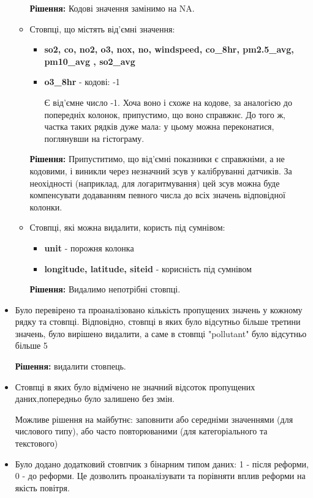 \documentclass[./report.tex]{subfiles}
\begin{document}
\begin{itemize}
\begin{itemize}
            \textbf{ Рішення:} Кодові значення замінимо на NA.

             \item Стовпці, що містять від'ємні значення:
             \begin{itemize}
                \item \textbf{so2, co, no2,  o3, nox, no, windspeed, co\_8hr, pm2.5\_avg, pm10\_avg , so2\_avg} 
                \item \textbf{o3\_8hr} - кодові: -1

                Є від'ємне число -1. Хоча воно і схоже на кодове, за аналогією до попередніх колонок, припустимо, що воно справжнє. До того ж, частка таких рядків дуже мала: у цьому можна переконатися, поглянувши на гістограму.
             \end{itemize}

             \textbf{Рішення:} Припуститимо, що від'ємні показники є справжніми, а не кодовими, і виникли через незначний зсув у калібруванні датчиків. За неохідності (наприклад, для логаритмування) цей зсув можна буде компенсувати додаванням певного числа до всіх значень відповідної колонки.
             
             \item Стовпці, які можна видалити, користь під сумнівом:
             \begin{itemize}
                 \item \textbf{unit} - порожня колонка
                 \item \textbf{longitude, latitude, siteid}  - корисність під сумнівом
             \end{itemize}
             
             \textbf{Рішення:} Видалимо непотрібні стовпці.
         \end{itemize}
    
    \item Було перевірено та проаналізовано кількість пропущених значень у кожному рядку та стовпці. Відповідно, стовпці в яких було відсутньо більше третини значень, було вирішено видалити, а саме в стовпці "pollutant" було відсутньо більше 5%
    
    \textbf{Рішення:} видалити стовпець.
    
    \item Стовпці в яких було відмічено не значний відсоток пропущених даних,попередньо було залишено без змін. 
    
    Можливе рішення на майбутнє: заповнити або середніми значеннями (для числового типу), або часто повторюваними (для категоріального та текстового) 
    
    \item Було додано додатковий стовпчик з бінарним типом даних: 1 - після реформи, 0 - до реформи. Це дозволить проаналізувати та порівняти вплив реформи на якість повітря.
\end{itemize}
\end{document}
